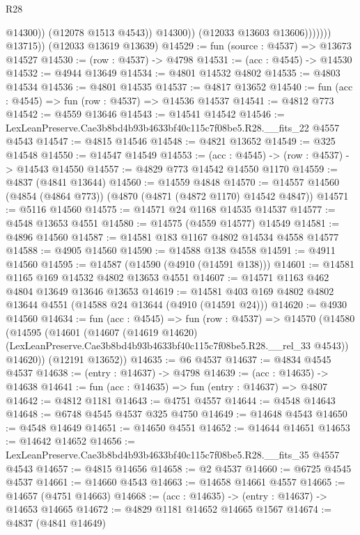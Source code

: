 \begin{lexlean}{R28}
\begin{coremodule}
                              @14300))
                          (@12078 @1513 @4543))
                        @14300))
                    (@12033 @13603 @13606)))))))
        @13715))
    (@12033 @13619 @13639)
@14529 := fun (source : @4537) => @13673 @14527
@14530 := (row : @4537) -> @4798
@14531 := (acc : @4545) -> @14530
@14532 := @4944 @13649
@14534 := @4801 @14532 @4802
@14535 := @4803 @14534
@14536 := @4801 @14535
@14537 := @4817 @13652
@14540 := fun (acc : @4545) => fun (row : @4537) => @14536 @14537
@14541 := @4812 @773
@14542 := @4559 @13646
@14543 := @14541 @14542
@14546 := LexLeanPreserve.Cae3b8bd4b93b4633bf40c115c7f08be5.R28.__fits_22 @4557 @4543
@14547 := @4815 @14546
@14548 := @4821 @13652
@14549 := @325 @14548
@14550 := @14547 @14549
@14553 := (acc : @4545) -> (row : @4537) -> @14543 @14550
@14557 := @4829 @773 @14542 @14550 @1170
@14559 := @4837 (@4841 @13644)
@14560 := @14559 @4848
@14570 := @14557 @14560 (@4854 (@4864 @773)) (@4870 (@4871 (@4872 @1170) @14542 @4847))
@14571 := @5116 @14560
@14575 := @14571 @24 @1168 @14535 @14537
@14577 := @4548 @13653 @4551
@14580 := @14575 (@4559 @14577) @14549
@14581 := @4896 @14560
@14587 := @14581 @183 @1167 @4802 @14534 @4558 @14577
@14588 := @4905 @14560
@14590 := @14588 @138 @4558
@14591 := @4911 @14560
@14595 := @14587 (@14590 (@4910 (@14591 @138)))
@14601 := @14581 @1165 @169 @14532 @4802 @13653 @4551
@14607 := @14571 @1163 @462 @4804 @13649 @13646 @13653
@14619 := @14581 @403 @169 @4802 @4802 @13644 @4551 (@14588 @24 @13644 (@4910 (@14591 @24)))
@14620 := @4930 @14560
@14634 := fun (acc : @4545) =>
  fun (row : @4537) =>
  @14570
    (@14580
      (@14595
        (@14601
          (@14607
            (@14619 @14620)
            (LexLeanPreserve.Cae3b8bd4b93b4633bf40c115c7f08be5.R28.__rel_33 @4543))
          @14620))
      (@12191 @13652))
@14635 := @6 @4537
@14637 := @4834 @4545 @4537
@14638 := (entry : @14637) -> @4798
@14639 := (acc : @14635) -> @14638
@14641 := fun (acc : @14635) => fun (entry : @14637) => @4807
@14642 := @4812 @1181
@14643 := @4751 @4557
@14644 := @4548 @14643
@14648 := @6748 @4545 @4537 @325 @4750
@14649 := @14648 @4543
@14650 := @4548 @14649
@14651 := @14650 @4551
@14652 := @14644 @14651
@14653 := @14642 @14652
@14656 := LexLeanPreserve.Cae3b8bd4b93b4633bf40c115c7f08be5.R28.__fits_35 @4557 @4543
@14657 := @4815 @14656
@14658 := @2 @4537
@14660 := @6725 @4545 @4537
@14661 := @14660 @4543
@14663 := @14658 @14661 @4557
@14665 := @14657 (@4751 @14663)
@14668 := (acc : @14635) -> (entry : @14637) -> @14653 @14665
@14672 := @4829 @1181 @14652 @14665 @1567
@14674 := @4837 (@4841 @14649)

\end{coremodule}
\end{lexlean}
